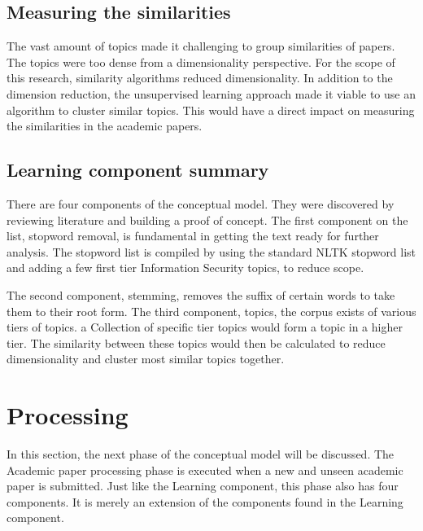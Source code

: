 \subsection{Measuring the similarities}
The vast amount of topics made it challenging to group similarities of papers. The topics were too dense from a dimensionality perspective. For the scope of this research, similarity algorithms reduced dimensionality. In addition to the dimension reduction, the unsupervised learning approach made it viable to use an algorithm to cluster similar topics. This would have a direct impact on measuring the similarities in the academic papers.

\subsection{Learning component summary}
There are four components of the conceptual model. They were discovered by reviewing literature and building a proof of concept. The first component on the list, stopword removal, is fundamental in getting the text ready for further analysis. The stopword list is compiled by using the standard NLTK stopword list and adding a few first tier Information Security topics, to reduce scope. 

The second component, stemming, removes the suffix of certain words to take them to their root form. The third component, topics, the corpus exists of various tiers of topics. a Collection of specific tier topics would form a topic in a higher tier. The similarity between these topics would then be calculated to reduce dimensionality and cluster most similar topics together.
\section{Processing}
In this section, the next phase of the conceptual model will be discussed. The Academic paper processing phase is executed when a new and unseen academic paper is submitted. Just like the Learning component, this phase also has four components. It is merely an extension of the components found in the Learning component. 


